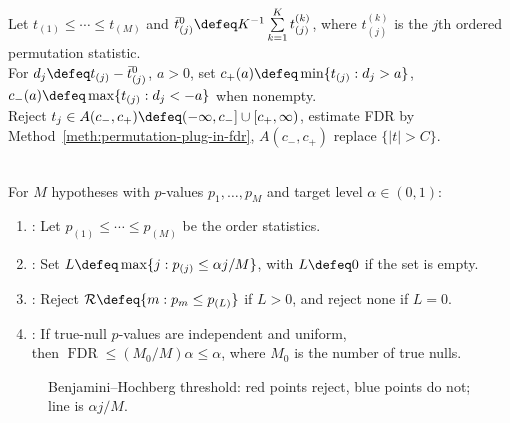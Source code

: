 \begin{remark} \label{rem:sam-asymmetric-cutpoints} \\
Let $t_{(1)}\leq\cdots\leq t_{(M)}$ and $\bar{t}^{0}_{(j)}\defeq K^{-1}\sum\limits_{k=1}^Kt^{(k)}_{(j)}$, where $t^{(k)}_{(j)}$ is the $j$th ordered permutation statistic.\\
For $d_j\defeq t_{(j)}-\bar{t}^{0}_{(j)}$, $a>0$, set $c_+(a)\defeq\min\{t_{(j)}:d_j>a\}$, $c_-(a)\defeq\max\{t_{(j)}:d_j<-a\}$ when nonempty.\\
Reject $t_j\in A(c_-,c_+)\defeq(-\infty,c_-]\cup[c_+,\infty)$, estimate FDR by Method~\ref{meth:permutation-plug-in-fdr}, $A(c_-,c_+)$ replace $\{|t|>C\}$.
\end{remark}

\begin{method} \label{meth:benjamini-hochberg-fdr-step-up} \\
For $M$ hypotheses with $p$-values $p_1,\ldots,p_M$ and target level $\alpha\in(0,1)$:
\begin{enumerate}[label=(\roman*)]
\setlength{\itemsep}{0pt}
\item {}: Let $p_{(1)}\leq\cdots\leq p_{(M)}$ be the order statistics.
\item {}: Set $L\defeq\max\{j:p_{(j)}\leq\alpha j/M\}$, with $L\defeq0$ if the set is empty.
\item {}: Reject $\mathcal{R}\defeq\{m:p_m\leq p_{(L)}\}$ if $L>0$, and reject none if $L=0$.
\item {}: If true-null $p$-values are independent and uniform,\\
then $\operatorname{FDR}\leq(M_0/M)\alpha\leq\alpha$, where $M_0$ is the number of true nulls.
\end{enumerate}
\end{method}

\begin{figure}[H]
\centering

\caption{Benjamini--Hochberg threshold: \textcolor{red!70!black}{red} points reject, \textcolor{blue!70!black}{blue} points do not; line is $\alpha j/M$.}
\label{fig:benjamini-hochberg-step-up}
\end{figure}

